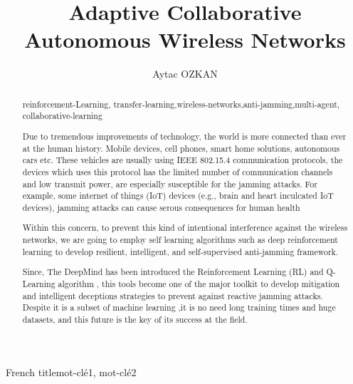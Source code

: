\documentclass[letterpaper%
, twoside%
, 12pt%
,thesepararticles%
, english%
,creativecommons,hyperref, withAlgo2e%
]{thETS}
\title{Adaptive Collaborative  Autonomous Wireless Networks}
\author{Aytac OZKAN}
\begin{document}

\maketitle

\presentjury

\begin{foreword}

\lipsum[1] %

\end{foreword}



\begin{acknowledgements}

\lipsum[1] %


\end{acknowledgements}



\begin{summary}{French title}{mot-clé1, mot-clé2}

\lipsum[1] %

\end{summary}


\begin{abstract}{reinforcement-Learning, transfer-learning,wireless-networks,anti-jamming,multi-agent, collaborative-learning}

Due to tremendous improvements of technology, the world is more connected than ever at the human history. Mobile devices, cell phones, smart home solutions, autonomous cars etc. These vehicles are usually using IEEE 802.15.4 communication protocols, the devices which uses this protocol has the limited number of communication channels and low transmit power, are especially susceptible for the jamming attacks. For example, some internet of things (IoT) devices (e.g., brain and heart inculcated IoT devices), jamming attacks can cause serous consequences for human health

Within this concern, to prevent this kind of intentional interference against the wireless networks, we are going to employ self learning algorithms such as deep reinforcement learning to develop resilient, intelligent, and self-supervised anti-jamming framework.

 Since, The DeepMind has been introduced the Reinforcement Learning (RL) and Q-Learning algorithm \cite{ACM:HasseltetSilver}, this tools become one of the major toolkit to develop mitigation and intelligent deceptions strategies to prevent against reactive jamming attacks. Despite it is a subset of machine learning \cite{Kasturi2020MachineLR},it is no need long training times and huge datasets, and this future is the key of its success at the field. 

\end{abstract}
\end{document}
